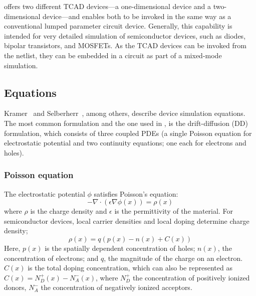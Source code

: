 \Xyce{} offers two different TCAD devices---a one-dimensional 
device and a two-dimensional device---and enables both to be invoked in the 
same way as a conventional lumped parameter circuit device. Generally, this 
capability is intended for very detailed simulation of semiconductor devices, 
such as diodes, bipolar transistors, and MOSFETs. As the \Xyce{} TCAD devices can
be invoked from the netlist, they can be embedded in a circuit as part of
a mixed-mode simulation.

\subsection{Equations}
Kramer~\cite{Kramer} and Selberherr~\cite{selberherr}, among others, describe 
device simulation equations. The most common formulation and the one used in 
\Xyce{}, is the drift-diffusion (DD) formulation, which consists of three coupled
PDEs (a single Poisson equation for electrostatic potential and two continuity
equations; one each for electrons and holes).

\subsubsection{Poisson equation}
The electrostatic potential $\phi$ satisfies Poisson's equation:
\begin{equation}
  -\nabla \cdot \left(\epsilon \nabla \phi(x) \right) = \rho(x) \label{poisson1}
\end{equation}
where $\rho$ is the charge density and $\epsilon$ is the permittivity of the
material.  For semiconductor devices, local carrier densities and local doping determine charge density;
\begin{equation}
  \rho(x) = q(p(x)-n(x)+C(x)) \label{poisson2}
\end{equation} 
Here, $p(x)$ is the spatially dependent concentration of holes; $n(x)$, the
concentration of electrons; and $q$, the magnitude of the charge on an electron.
$C(x)$ is the total doping concentration, which can also be represented as
$C(x)=N^+_D(x)-N^-_A(x)$, where $N^+_D$ the concentration of positively ionized
donors, $N^-_A$ the concentration of negatively ionized acceptors.

